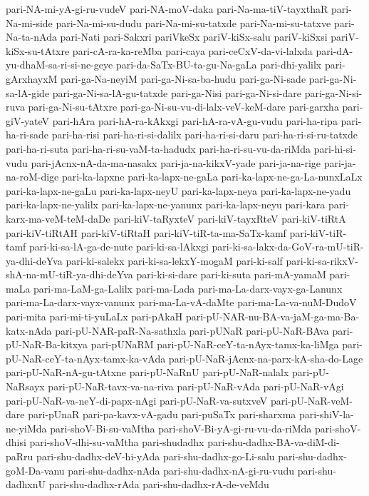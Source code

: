 {pari-NA-mi-yA-gi-ru-vudeV
pari-NA-moV-daka
pari-Na-ma-tiV-tayxthaR
pari-Na-mi-side
pari-Na-mi-su-dudu
pari-Na-mi-su-tatxde
pari-Na-mi-su-tatxve
pari-Na-ta-nAda
pari-Nati
pari-Sakxri
pariVkeSx
pariV-kiSx-salu
pariV-kiSxsi
pariV-kiSx-su-tAtxre
pari-cA-ra-ka-reMba
pari-caya
pari-ceCxV-da-vi-lalxda
pari-dA-yu-dhaM-sa-ri-si-ne-geye
pari-da-SaTx-BU-ta-gu-Na-gaLa
pari-dhi-yalilx
pari-gArxhayxM
pari-ga-Na-neyiM
pari-ga-Ni-sa-ba-hudu
pari-ga-Ni-sade
pari-ga-Ni-sa-lA-gide
pari-ga-Ni-sa-lA-gu-tatxde
pari-ga-Nisi
pari-ga-Ni-si-dare
pari-ga-Ni-si-ruva
pari-ga-Ni-su-tAtxre
pari-ga-Ni-su-vu-di-lalx-veV-keM-dare
pari-garxha
pari-giV-yateV
pari-hAra
pari-hA-ra-kAkxgi
pari-hA-ra-vA-gu-vudu
pari-ha-ripa
pari-ha-ri-sade
pari-ha-risi
pari-ha-ri-si-dalilx
pari-ha-ri-si-daru
pari-ha-ri-si-ru-tatxde
pari-ha-ri-suta
pari-ha-ri-su-vaM-ta-hadudx
pari-ha-ri-su-vu-da-riMda
pari-hi-si-vudu
pari-jAcnx-nA-da-ma-nasakx
pari-ja-na-kikxV-yade
pari-ja-na-rige
pari-ja-na-roM-dige
pari-ka-lapxne
pari-ka-lapx-ne-gaLa
pari-ka-lapx-ne-ga-La-nunxLaLx
pari-ka-lapx-ne-gaLu
pari-ka-lapx-neyU
pari-ka-lapx-neya
pari-ka-lapx-ne-yadu
pari-ka-lapx-ne-yalilx
pari-ka-lapx-ne-yanunx
pari-ka-lapx-neyu
pari-kara
pari-karx-ma-veM-teM-daDe
pari-kiV-taRyxteV
pari-kiV-tayxRteV
pari-kiV-tiRtA
pari-kiV-tiRtAH
pari-kiV-tiRtaH
pari-kiV-tiR-ta-ma-SaTx-kamf
pari-kiV-tiR-tamf
pari-ki-sa-lA-ga-de-nute
pari-ki-sa-lAkxgi
pari-ki-sa-lakx-da-GoV-ra-mU-tiR-ya-dhi-deYva
pari-ki-salekx
pari-ki-sa-lekxY-mogaM
pari-ki-salf
pari-ki-sa-rikxV-shA-na-mU-tiR-ya-dhi-deYva
pari-ki-si-dare
pari-ki-suta
pari-mA-yamaM
pari-maLa
pari-ma-LaM-ga-Lalilx
pari-ma-Lada
pari-ma-La-darx-vayx-ga-Lanunx
pari-ma-La-darx-vayx-vanunx
pari-ma-La-vA-daMte
pari-ma-La-va-nuM-DudoV
pari-mita
pari-mi-ti-yuLaLx
pari-pAkaH
pari-pU-NAR-nu-BA-va-jaM-ga-ma-Ba-katx-nAda
pari-pU-NAR-paR-Na-sathxla
pari-pUNaR
pari-pU-NaR-BAva
pari-pU-NaR-Ba-kitxya
pari-pUNaRM
pari-pU-NaR-ceY-ta-nAyx-tamx-ka-liMga
pari-pU-NaR-ceY-ta-nAyx-tamx-ka-vAda
pari-pU-NaR-jAcnx-na-parx-kA-sha-do-Lage
pari-pU-NaR-nA-gu-tAtxne
pari-pU-NaRnU
pari-pU-NaR-nalalx
pari-pU-NaRsayx
pari-pU-NaR-tavx-va-na-riva
pari-pU-NaR-vAda
pari-pU-NaR-vAgi
pari-pU-NaR-va-neY-di-papx-nAgi
pari-pU-NaR-va-sutxveV
pari-pU-NaR-veM-dare
pari-pUnaR
pari-pa-kavx-vA-gadu
pari-puSaTx
pari-sharxma
pari-shiV-la-ne-yiMda
pari-shoV-Bi-su-vaMtha
pari-shoV-Bi-yA-gi-ru-vu-da-riMda
pari-shoV-dhisi
pari-shoV-dhi-su-vaMtha
pari-shudadhx
pari-shu-dadhx-BA-va-diM-di-paRru
pari-shu-dadhx-deV-hi-yAda
pari-shu-dadhx-go-Li-salu
pari-shu-dadhx-goM-Da-vanu
pari-shu-dadhx-nAda
pari-shu-dadhx-nA-gi-ru-vudu
pari-shu-dadhxnU
pari-shu-dadhx-rAda
pari-shu-dadhx-rA-de-veMdu
}
